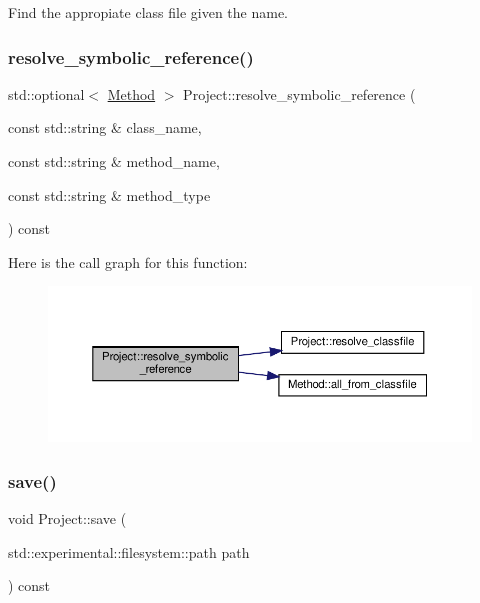 Find the appropiate class file given the name. 

\mbox{\label{classProject_a2bf65efcb1e91bfe76d2faab76127c11}} 
\subsubsection{\texorpdfstring{resolve\+\_\+symbolic\+\_\+reference()}{resolve\_symbolic\_reference()}}
{\footnotesize\ttfamily std\+::optional$<$ \hyperlink{classMethod}{Method} $>$ Project\+::resolve\+\_\+symbolic\+\_\+reference (\begin{DoxyParamCaption}\item[{const std\+::string \&}]{class\+\_\+name,  }\item[{const std\+::string \&}]{method\+\_\+name,  }\item[{const std\+::string \&}]{method\+\_\+type }\end{DoxyParamCaption}) const}

Here is the call graph for this function\+:\nopagebreak
\begin{figure}[H]
\begin{center}
\leavevmode
\includegraphics[width=350pt]{classProject_a2bf65efcb1e91bfe76d2faab76127c11_cgraph}
\end{center}
\end{figure}
\mbox{\label{classProject_aff5e62e0e0e3e8c7123a7dd6ae51cb3f}} 
\subsubsection{\texorpdfstring{save()}{save()}}
{\footnotesize\ttfamily void Project\+::save (\begin{DoxyParamCaption}\item[{std\+::experimental\+::filesystem\+::path}]{path }\end{DoxyParamCaption}) const}



